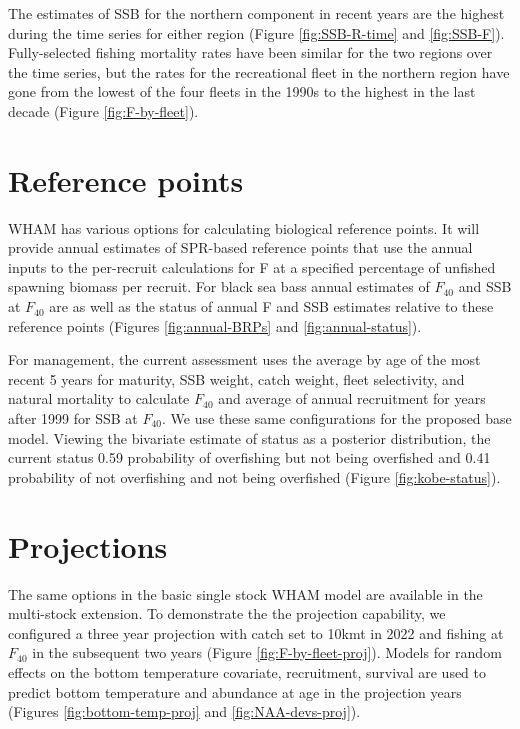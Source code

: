 \documentclass[
]{article}
\begin{document}
The estimates of SSB for the northern component in recent years are the highest during the time series for either region (Figure \ref{fig:SSB-R-time} and \ref{fig:SSB-F}). Fully-selected fishing mortality rates have been similar for the two regions over the time series, but the rates for the recreational fleet in the northern region have gone from the lowest of the four fleets in the 1990s to the highest in the last decade (Figure \ref{fig:F-by-fleet}).

\hypertarget{reference-points}{%
\section{Reference points}\label{reference-points}}

WHAM has various options for calculating biological reference points. It will provide annual estimates of SPR-based reference points that use the annual inputs to the per-recruit calculations for F at a specified percentage of unfished spawning biomass per recruit. For black sea bass annual estimates of \(F_{40}\) and SSB at \(F_{40}\) are as well as the status of annual F and SSB estimates relative to these reference points (Figures \ref{fig:annual-BRPs} and \ref{fig:annual-status}).

For management, the current assessment uses the average by age of the most recent 5 years for maturity, SSB weight, catch weight, fleet selectivity, and natural mortality to calculate \(F_{40}\) and average of annual recruitment for years after 1999 for SSB at \(F_{40}\). We use these same configurations for the proposed base model. Viewing the bivariate estimate of status as a posterior distribution, the current status 0.59 probability of overfishing but not being overfished and 0.41 probability of not overfishing and not being overfished (Figure \ref{fig:kobe-status}).

\hypertarget{projections}{%
\section{Projections}\label{projections}}

The same options in the basic single stock WHAM model are available in the multi-stock extension. To demonstrate the the projection capability, we configured a three year projection with catch set to 10kmt in 2022 and fishing at \(F_{40}\) in the subsequent two years (Figure \ref{fig:F-by-fleet-proj}). Models for random effects on the bottom temperature covariate, recruitment, survival are used to predict bottom temperature and abundance at age in the projection years (Figures \ref{fig:bottom-temp-proj} and \ref{fig:NAA-devs-proj}).
\end{document}
